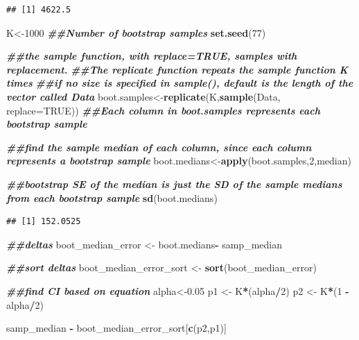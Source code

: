 \documentclass[
]{book}
\newenvironment{Shaded}{\begin{snugshade}}{\end{snugshade}}
\newcommand{\AttributeTok}[1]{\textcolor[rgb]{0.13,0.29,0.53}{#1}}
\newcommand{\ConstantTok}[1]{\textcolor[rgb]{0.56,0.35,0.01}{#1}}
\newcommand{\DecValTok}[1]{\textcolor[rgb]{0.00,0.00,0.81}{#1}}
\newcommand{\DocumentationTok}[1]{\textcolor[rgb]{0.56,0.35,0.01}{\textbf{\textit{#1}}}}
\newcommand{\FloatTok}[1]{\textcolor[rgb]{0.00,0.00,0.81}{#1}}
\newcommand{\FunctionTok}[1]{\textcolor[rgb]{0.13,0.29,0.53}{\textbf{#1}}}
\newcommand{\NormalTok}[1]{#1}
\newcommand{\OtherTok}[1]{\textcolor[rgb]{0.56,0.35,0.01}{#1}}
\newcommand{\SpecialCharTok}[1]{\textcolor[rgb]{0.81,0.36,0.00}{\textbf{#1}}}
\theoremstyle{definition}
\theoremstyle{definition}
\theoremstyle{definition}
\theoremstyle{definition}
\theoremstyle{remark}
\begin{document}
\begin{verbatim}
## [1] 4622.5
\end{verbatim}

\begin{Shaded}
\begin{Highlighting}[]
\NormalTok{K}\OtherTok{\textless{}{-}}\DecValTok{1000} \DocumentationTok{\#\#Number of bootstrap samples}
\FunctionTok{set.seed}\NormalTok{(}\DecValTok{77}\NormalTok{)}

\DocumentationTok{\#\#the sample function, with replace=TRUE, samples with replacement. }
\DocumentationTok{\#\#The replicate function repeats the sample function K times}
\DocumentationTok{\#\#if no size is specified in sample(), default is the length of the vector called Data}
\NormalTok{boot.samples}\OtherTok{\textless{}{-}}\FunctionTok{replicate}\NormalTok{(K,}\FunctionTok{sample}\NormalTok{(Data, }\AttributeTok{replace=}\ConstantTok{TRUE}\NormalTok{))}
\DocumentationTok{\#\#Each column in boot.samples represents each bootstrap sample}

\DocumentationTok{\#\#find the sample median of each column, since each column represents a bootstrap sample}
\NormalTok{boot.medians}\OtherTok{\textless{}{-}}\FunctionTok{apply}\NormalTok{(boot.samples,}\DecValTok{2}\NormalTok{,median)}


\DocumentationTok{\#\#bootstrap SE of the median is just the SD of the sample medians from each bootstrap sample}
\FunctionTok{sd}\NormalTok{(boot.medians)}
\end{Highlighting}
\end{Shaded}

\begin{verbatim}
## [1] 152.0525
\end{verbatim}

\begin{Shaded}
\begin{Highlighting}[]
\DocumentationTok{\#\#deltas}
\NormalTok{boot\_median\_error }\OtherTok{\textless{}{-}}\NormalTok{ boot.medians}\SpecialCharTok{{-}}\NormalTok{ samp\_median}

\DocumentationTok{\#\#sort deltas}
\NormalTok{boot\_median\_error\_sort }\OtherTok{\textless{}{-}} \FunctionTok{sort}\NormalTok{(boot\_median\_error)}

\DocumentationTok{\#\#find CI based on equation}
\NormalTok{alpha}\OtherTok{\textless{}{-}}\FloatTok{0.05}
\NormalTok{p1 }\OtherTok{\textless{}{-}}\NormalTok{ K}\SpecialCharTok{*}\NormalTok{(alpha}\SpecialCharTok{/}\DecValTok{2}\NormalTok{)}
\NormalTok{p2 }\OtherTok{\textless{}{-}}\NormalTok{ K}\SpecialCharTok{*}\NormalTok{(}\DecValTok{1} \SpecialCharTok{{-}}\NormalTok{ alpha}\SpecialCharTok{/}\DecValTok{2}\NormalTok{)}

\NormalTok{samp\_median }\SpecialCharTok{{-}}\NormalTok{ boot\_median\_error\_sort[}\FunctionTok{c}\NormalTok{(p2,p1)]}
\end{Highlighting}
\end{Shaded}
\end{document}
